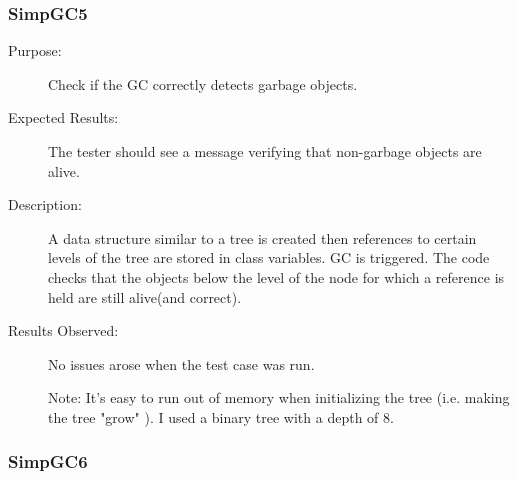 \subsubsection{SimpGC5}

\begin{description}
    \item[Purpose:]
Check if the GC correctly detects garbage objects.
    \item[Expected Results:]
The tester should see a message verifying that non-garbage objects
are alive.
    \item[Description:]
A data structure similar to a tree is created then references to
certain levels of the tree are stored in class variables. GC is
triggered. The code checks that the objects below the level of the
node for which a reference is held are still alive(and correct).
    \item[Results Observed:]
No issues arose when the test case was run.

Note: It's easy to run out of memory when initializing the tree
(i.e. making the tree "grow" ). I used a binary tree with a depth of
8.

\end{description}

\subsubsection{SimpGC6}

